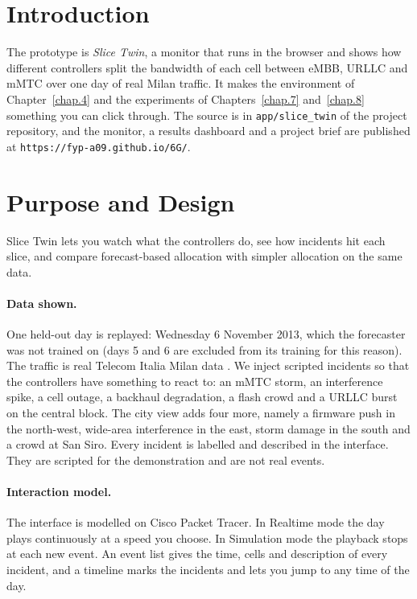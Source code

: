 \label{chap.9}
\section{Introduction}
The prototype is \emph{Slice Twin}, a monitor that runs in the browser and shows how different controllers split the bandwidth of each cell between eMBB, URLLC and mMTC over one day of real Milan traffic. It makes the environment of Chapter~\ref{chap.4} and the experiments of Chapters~\ref{chap.7} and~\ref{chap.8} something you can click through. The source is in \texttt{app/slice\_twin} of the project repository, and the monitor, a results dashboard and a project brief are published at \texttt{https://fyp-a09.github.io/6G/}.

\section{Purpose and Design}
Slice Twin lets you watch what the controllers do, see how incidents hit each slice, and compare forecast-based allocation with simpler allocation on the same data.

\paragraph{Data shown.}
One held-out day is replayed: Wednesday 6 November 2013, which the forecaster was not trained on (days 5 and 6 are excluded from its training for this reason). The traffic is real Telecom Italia Milan data \cite{barlacchi2015}. We inject scripted incidents so that the controllers have something to react to: an mMTC storm, an interference spike, a cell outage, a backhaul degradation, a flash crowd and a URLLC burst on the central block. The city view adds four more, namely a firmware push in the north-west, wide-area interference in the east, storm damage in the south and a crowd at San Siro. Every incident is labelled and described in the interface. They are scripted for the demonstration and are not real events.

\paragraph{Interaction model.}
The interface is modelled on Cisco Packet Tracer. In Realtime mode the day plays continuously at a speed you choose. In Simulation mode the playback stops at each new event. An event list gives the time, cells and description of every incident, and a timeline marks the incidents and lets you jump to any time of the day.

